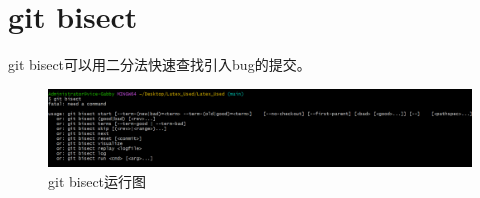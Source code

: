 \documentclass{article}
\begin{document}
\section{git bisect}
git bisect可以用二分法快速查找引入bug的提交。
\begin{figure}[H]
    \centering
    \includegraphics[width=1\linewidth]{git_bisect.png}
    \caption{git bisect运行图}
    \label{fig:bisect}
\end{figure}
\end{document}
